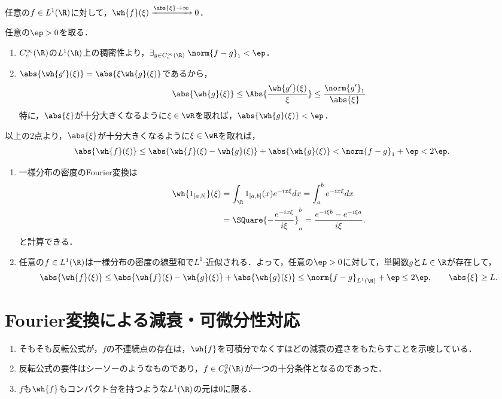 \documentclass[uplatex,dvipdfmx]{jsreport}
\begin{document}
\begin{corollary}\label{cor-Riemann-Lebesgue-R}
    任意の$f\in L^1(\R)$に対して，$\wh{f}(\xi)\xrightarrow{\abs{\xi}\to\infty}0$．
\end{corollary}
\begin{Proof}
    任意の$\ep>0$を取る．
    \begin{enumerate}
        \item $C_c^\infty(\R)$の$L^1(\R)$上の稠密性より，$\exists_{g\in C_c^\infty(\R)}\;\norm{f-g}_1<\ep$．
        \item $\abs{\wh{g'}(\xi)}=\abs{\xi\wh{g}(\xi)}$であるから，
        \[\abs{\wh{g}(\xi)}\le\Abs{\frac{\wh{g'}(\xi)}{\xi}}\le\frac{\norm{g'}_1}{\abs{\xi}}\]
        特に，$\abs{\xi}$が十分大きくなるように$\xi\in\wR$を取れば，$\abs{\wh{g}(\xi)}<\ep$．
    \end{enumerate}
    以上の2点より，$\abs{\xi}$が十分大きくなるように$\xi\in\wR$を取れば，
    \[\abs{\wh{f}(\xi)}\le\abs{\wh{f}(\xi)-\wh{g}(\xi)}+\abs{\wh{g}(\xi)}<\norm{f-g}_1+\ep<2\ep.\]
\end{Proof}
\begin{Proof}\mbox{}
    \begin{enumerate}[{Step}1]
        \item 一様分布の密度のFourier変換は
        \begin{align*}
            \wh{1_{[a,b]}}(\xi)&=\int_\R 1_{[a,b]}(x)e^{-ix\xi}dx=\int^b_ae^{-ix\xi}dx\\
            &=\SQuare{-\frac{e^{-ix\xi}}{i\xi}}^b_a=\frac{e^{-i\xi b}-e^{-i\xi a}}{i\xi}.
        \end{align*}
        と計算できる．
        \item 任意の$f\in L^1(\R)$は一様分布の密度の線型和で$L^1$-近似される．よって，任意の$\ep>0$に対して，単関数$g$と$L\in\R$が存在して，
        \[\abs{\wh{f}(\xi)}\le\abs{\wh{f}(\xi)-\wh{g}(\xi)}+\abs{\wh{g}(\xi)}\le\norm{f-g}_{L^1(\R)}+\ep\le 2\ep,\qquad\abs{\xi}\ge L.\]

    \end{enumerate}
\end{Proof}

\section{Fourier変換による減衰・可微分性対応}

\begin{tcolorbox}[colframe=ForestGreen, colback=ForestGreen!10!white,breakable,colbacktitle=ForestGreen!40!white,coltitle=black,fonttitle=\bfseries\sffamily,
title=]
    \begin{enumerate}
        \item そもそも反転公式が，$f$の不連続点の存在は，$\wh{f}$を可積分でなくすほどの減衰の遅さをもたらすことを示唆している．
        \item 反転公式の要件はシーソーのようなものであり，$f\in C_b^2(\R)$が一つの十分条件となるのであった．
        \item $f$も$\wh{f}$もコンパクト台を持つような$L^1(\R)$の元は$0$に限る．
    \end{enumerate}
\end{tcolorbox}
\end{document}
